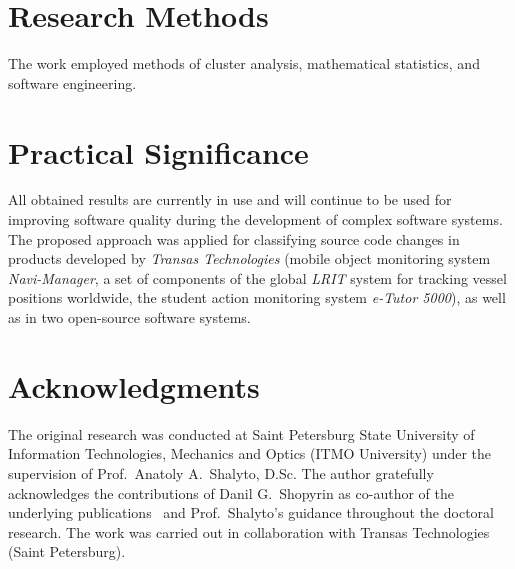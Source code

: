 \documentclass[11pt,a4paper]{article}
\begin{document}
\section*{Research Methods}

The work employed methods of cluster analysis, mathematical statistics, and software engineering.

\section*{Practical Significance}

All obtained results are currently in use and will continue to be used for improving software quality during the development of complex software systems. The proposed approach was applied for classifying source code changes in products developed by \textit{Transas Technologies} (mobile object monitoring system \textit{Navi-Manager}, a set of components of the global \textit{LRIT} system for tracking vessel positions worldwide, the student action monitoring system \textit{e-Tutor 5000}), as well as in two open-source software systems.

\section*{Acknowledgments}

The original research was conducted at Saint Petersburg State University of Information Technologies, Mechanics and Optics (ITMO University) under the supervision of Prof.\ Anatoly A.\ Shalyto, D.Sc. The author gratefully acknowledges the contributions of Danil G.\ Shopyrin as co-author of the underlying publications~\cite{Knyazev2008a,Knyazev2008b,Knyazev2007a} and Prof.\ Shalyto's guidance throughout the doctoral research. The work was carried out in collaboration with Transas Technologies (Saint Petersburg).
\end{document}
